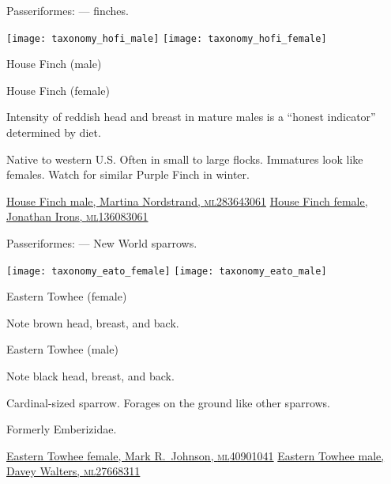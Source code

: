 \documentclass[t]{beamer}
\newcommand{\backoneline}{\vspace{-\baselineskip}}
\begin{document}
%

\begin{frame}{Passeriformes:  — finches.}
	
	\texttt{[image: taxonomy\_hofi\_male]}\hfill
	\texttt{[image: taxonomy\_hofi\_female]}
	
	\backoneline
	
	\begin{multicols}{2}
		House Finch (male)
		
		\columnbreak
		
		House Finch (female)
		
	\end{multicols}	
	
	Intensity of reddish head and breast in mature males is a “honest indicator” determined by diet.
	
	\medskip
	
	Native to western U.S. Often in small to large flocks. Immatures look like females. Watch for similar Purple Finch in winter.
	
	\vfilll
	
	\tiny
	
	\href{https://macaulaylibrary.org/asset/283643061}{House Finch male, Martina Nordstrand, \textsc{ml}283643061} \hfill 
	\href{https://macaulaylibrary.org/asset/136083061}{House Finch female, Jonathan Irons, \textsc{ml}136083061}
	
\end{frame}

%

\begin{frame}{Passeriformes:  — New World sparrows.}
	
		\texttt{[image: taxonomy\_eato\_female]}\hfill
		\texttt{[image: taxonomy\_eato\_male]}
	
		\backoneline
		
		\begin{multicols}{2}
				Eastern Towhee (female)
				
				\medskip
				
				Note brown head, breast, and back.
				
				\columnbreak
				
				Eastern Towhee (male)
				
				\medskip
				
				Note black head, breast, and back.
				
			\end{multicols}	
		
		Cardinal-sized sparrow. Forages on the ground like other sparrows.
		
		\medskip
		
		Formerly Emberizidae.
		
		\vfilll
		
		\tiny
		
		\href{https://macaulaylibrary.org/asset/40901041}{Eastern Towhee female, Mark R.~Johnson, \textsc{ml}40901041} \hfill 
		\href{https://macaulaylibrary.org/asset/27668311}{Eastern Towhee male, Davey Walters, \textsc{ml}27668311}
	
\end{frame}
\end{document}
